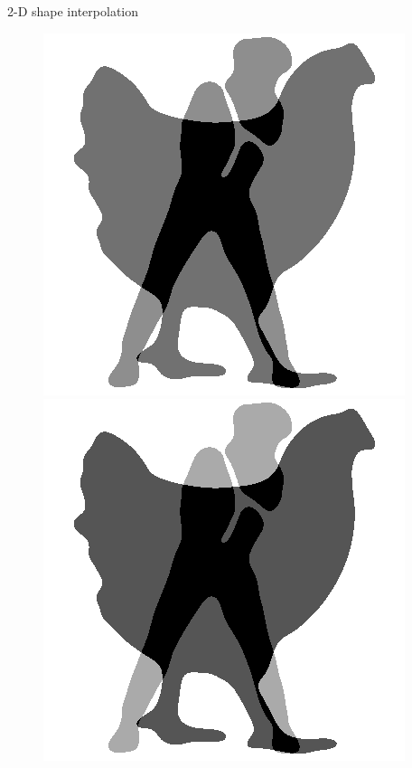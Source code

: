 \begin{frame}{2-D shape interpolation}
\begin{figure}
\begin{minipage}[t]{0.08\linewidth}
        \end{minipage}
        \hfill
        \begin{minipage}[t]{0.08\linewidth}
            \vspace{0pt}
            \centering
            \includegraphics[width=\textwidth]{png/kun-chicken/color5.png}
        \end{minipage}
        \hfill
        \begin{minipage}[t]{0.08\linewidth}
            \vspace{0pt}
            \centering
            \includegraphics[width=\textwidth]{png/kun-chicken/color6.png}

\end{minipage}
\end{figure}
\end{frame}
